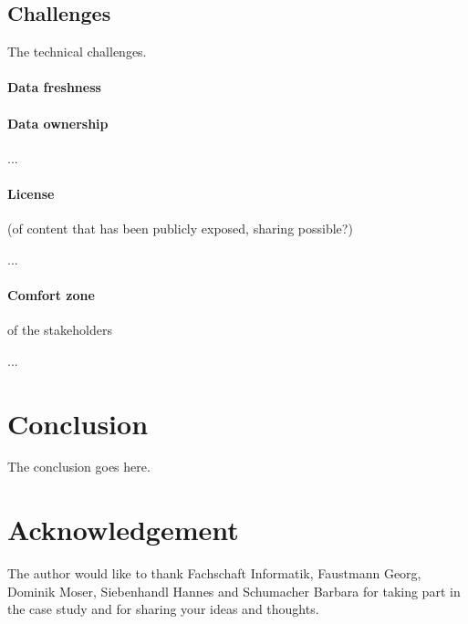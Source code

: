 \documentclass{article}
\begin{document}
\subsection{Challenges}
\label{technical-architecture-challenges:challenges}

The technical challenges. 

\paragraph{Data freshness}
\label{technical-architecture-challenges:challenges:data-freshness}

\paragraph{Data ownership}
\label{technical-architecture-challenges:challenges:data-ownership}

...

\paragraph{License} (of content that has been publicly exposed, sharing possible?)
\label{technical-architecture-challenges:challenges:license}

...

\paragraph{Comfort zone} of the stakeholders
\label{technical-architecture-challenges:challenges:comfort-zone}

...


\section{Conclusion}
\label{conclusion}
The conclusion goes here.

 
\section{Acknowledgement}
\label{acknowledgement}
The author would like to thank Fachschaft Informatik, Faustmann Georg, Dominik Moser, Siebenhandl Hannes and Schumacher Barbara for taking part in the case study and for sharing your ideas and thoughts.
\end{document}
